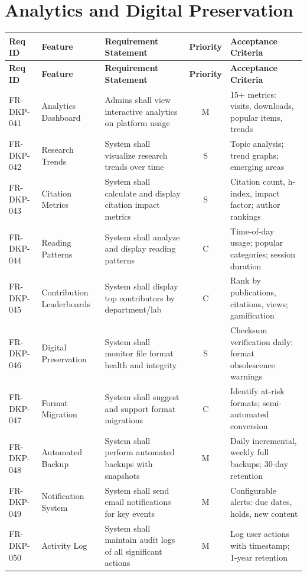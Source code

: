 \documentclass[12pt,a4paper]{report}
\begin{document}
\section{Analytics and Digital Preservation}
\begin{longtable}{|p{2cm}|p{3cm}|p{5cm}|c|p{3cm}|}
\hline
\textbf{Req ID} & \textbf{Feature} & \textbf{Requirement Statement} & \textbf{Priority} & \textbf{Acceptance Criteria} \\ \hline
\endfirsthead
\hline
\textbf{Req ID} & \textbf{Feature} & \textbf{Requirement Statement} & \textbf{Priority} & \textbf{Acceptance Criteria} \\ \hline
\endhead
FR-DKP-041 & Analytics Dashboard & Admins shall view interactive analytics on platform usage & M & 15+ metrics: visits, downloads, popular items, trends \\ \hline
FR-DKP-042 & Research Trends & System shall visualize research trends over time & S & Topic analysis; trend graphs; emerging areas \\ \hline
FR-DKP-043 & Citation Metrics & System shall calculate and display citation impact metrics & S & Citation count, h-index, impact factor; author rankings \\ \hline
FR-DKP-044 & Reading Patterns & System shall analyze and display reading patterns & C & Time-of-day usage; popular categories; session duration \\ \hline
FR-DKP-045 & Contribution Leaderboards & System shall display top contributors by department/lab & C & Rank by publications, citations, views; gamification \\ \hline
FR-DKP-046 & Digital Preservation & System shall monitor file format health and integrity & S & Checksum verification daily; format obsolescence warnings \\ \hline
FR-DKP-047 & Format Migration & System shall suggest and support format migrations & C & Identify at-risk formats; semi-automated conversion \\ \hline
FR-DKP-048 & Automated Backup & System shall perform automated backups with snapshots & M & Daily incremental, weekly full backups; 30-day retention \\ \hline
FR-DKP-049 & Notification System & System shall send email notifications for key events & M & Configurable alerts: due dates, holds, new content \\ \hline
FR-DKP-050 & Activity Log & System shall maintain audit logs of all significant actions & M & Log user actions with timestamp; 1-year retention \\ \hline
\end{longtable}
\end{document}
